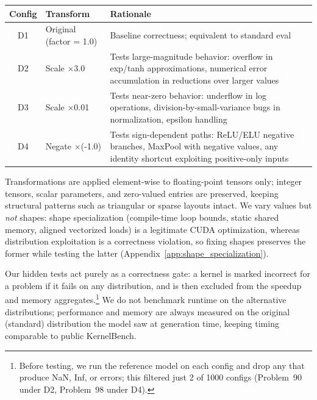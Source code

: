 \documentclass[11pt]{article}
\begin{document}
\begin{center}\small
\begin{tabular}{clp{9cm}}
\toprule
\textbf{Config} & \textbf{Transform} & \textbf{Rationale} \\
\midrule
D1 & Original (factor = 1.0) & Baseline correctness; equivalent to standard eval \\
D2 & Scale $\times$3.0 & Tests large-magnitude behavior: overflow in exp/tanh approximations, numerical error accumulation in reductions over larger values \\
D3 & Scale $\times$0.01 & Tests near-zero behavior: underflow in log operations, division-by-small-variance bugs in normalization, epsilon handling \\
D4 & Negate $\times$(-1.0) & Tests sign-dependent paths: ReLU/ELU negative branches, MaxPool with negative values, any identity shortcut exploiting positive-only inputs \\
\bottomrule
\end{tabular}
\end{center}

Transformations are applied element-wise to floating-point tensors only; integer tensors, scalar parameters, and zero-valued entries are preserved, keeping structural patterns such as triangular or sparse layouts intact. We vary values but \emph{not} shapes: shape specialization (compile-time loop bounds, static shared memory, aligned vectorized loads) is a legitimate CUDA optimization, whereas distribution exploitation is a correctness violation, so fixing shapes preserves the former while testing the latter (Appendix~\ref{app:shape_specialization}).

Our hidden tests act purely as a correctness gate: a kernel is marked incorrect for a problem if it fails on any distribution, and is then excluded from the speedup and memory aggregates.\footnote{Before testing, we run the reference model on each config and drop any that produce NaN, Inf, or errors; this filtered just 2 of 1000 configs (Problem~90 under D2, Problem~98 under D4).}  We do not benchmark runtime on the alternative distributions; performance and memory are always measured on the original (standard) distribution the model saw at generation time, keeping timing comparable to public KernelBench.
\end{document}
